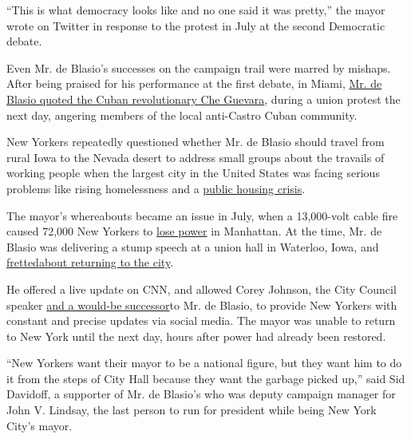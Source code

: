 ``This is what democracy looks like and no one said it was pretty,'' the
mayor wrote on Twitter in response to the protest in July at the second
Democratic debate.

Even Mr. de Blasio's successes on the campaign trail were marred by
mishaps. After being praised for his performance at the first debate, in
Miami,
\href{https://www.nytimes3xbfgragh.onion/2019/06/28/nyregion/de-blasio-che-guevara.html}{Mr.
de Blasio quoted the Cuban revolutionary Che Guevara}, during a union
protest the next day, angering members of the local anti-Castro Cuban
community.

New Yorkers repeatedly questioned whether Mr. de Blasio should travel
from rural Iowa to the Nevada desert to address small groups about the
travails of working people when the largest city in the United States
was facing serious problems like rising homelessness and a
\href{https://www.nytimes3xbfgragh.onion/2019/01/31/nyregion/hud-nycha-deal.html}{public
housing crisis}.

The mayor's whereabouts became an issue in July, when a 13,000-volt
cable fire caused 72,000 New Yorkers to
\href{https://www.nytimes3xbfgragh.onion/2019/07/15/nyregion/nyc-blackout-con-edison.html}{lose
power} in Manhattan. At the time, Mr. de Blasio was delivering a stump
speech at a union hall in Waterloo, Iowa, and
\href{https://www.nytimes3xbfgragh.onion/2019/07/14/nyregion/bill-de-blasio-nyc-blackout.html?rref=collection\%2Fbyline\%2Fjeffery-c.-mays\&action=click\&contentCollection=undefined\&region=stream\&module=stream_unit\&version=latest\&contentPlacement=6\&pgtype=collection}{fretted}\href{https://www.nytimes3xbfgragh.onion/2019/07/14/nyregion/bill-de-blasio-nyc-blackout.html?rref=collection\%2Fbyline\%2Fjeffery-c.-mays\&action=click\&contentCollection=undefined\&region=stream\&module=stream_unit\&version=latest\&contentPlacement=6\&pgtype=collection}{about
returning to the city}.

He offered a live update on CNN, and allowed Corey Johnson, the City
Council speaker
\href{https://www.nytimes3xbfgragh.onion/2019/06/06/nyregion/corey-johnson-bill-deblasio.html}{and
a would-be successor}to Mr. de Blasio, to provide New Yorkers with
constant and precise updates via social media. The mayor was unable to
return to New York until the next day, hours after power had already
been restored.

``New Yorkers want their mayor to be a national figure, but they want
him to do it from the steps of City Hall because they want the garbage
picked up,'' said Sid Davidoff, a supporter of Mr. de Blasio's who was
deputy campaign manager for John V. Lindsay, the last person to run for
president while being New York City's mayor.

